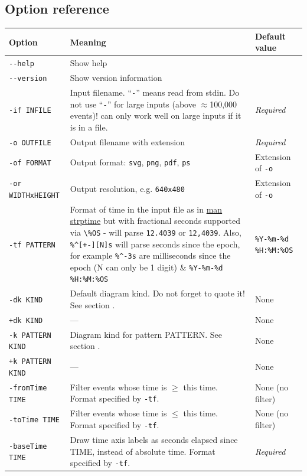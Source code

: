 \documentclass{article}
\begin{document}
\subsection{Option reference}
\begin{longtable}{|l|p{160px}|l|}
\hline
\textbf{Option} & \textbf{Meaning} & \textbf{Default value} \\
\hline
\endhead
\verb|--help| & Show help & \\
\hline
\verb|--version| & Show version information & \\
\hline
\verb|-if INFILE| & Input filename. ``\texttt{-}'' means read from stdin. Do not use ``\texttt{-}'' for large inputs (above $\approx$100,000 events)! \timeplot{} can only work well on large inputs if it is in a file. & \emph{Required} \\
\hline
\verb|-o OUTFILE| & Output filename with extension & \emph{Required} \\
\hline
\verb|-of FORMAT| & Output format: \texttt{svg}, \texttt{png}, \texttt{pdf}, \texttt{ps} & Extension of \texttt{-o} \\
\hline
\verb|-or WIDTHxHEIGHT| & Output resolution, e.g. \texttt{640x480} & Extension of \texttt{-o} \\
\hline
\verb|-tf PATTERN| & Format of time in the input file as in \href{http://linux.die.net/man/3/strptime}{man strptime} but with fractional seconds supported via \verb|\%OS| - will parse \verb|12.4039| or \verb|12,4039|.  Also, \verb|%^[+-][N]s| will parse seconds since the epoch, for example \verb|%^-3s| are milliseconds since the epoch (N can only be 1 digit) & \verb|%Y-%m-%d %H:%M:%OS| \\
\hline
\verb|-dk KIND| & Default diagram kind. Do not forget to quote it! See section \nameref{sec:tplot-track-mapping}. & None \\
\hline
\verb|+dk KIND| & --- & None \\
\hline
\verb|-k PATTERN KIND| & Diagram kind for pattern PATTERN. See section \nameref{sec:tplot-track-mapping}. & None \\
\hline
\verb|+k PATTERN KIND| & --- & None \\
\hline
\verb|-fromTime TIME| & Filter events whose time is $\ge$ this time. Format specified by \texttt{-tf}. & None (no filter) \\
\hline
\verb|-toTime TIME| & Filter events whose time is $\le$ this time. Format specified by \texttt{-tf}. & None (no filter) \\
\hline
\verb|-baseTime TIME| & Draw time axis labels as seconds elapsed since TIME, instead of absolute time. Format specified by \texttt{-tf}. & \emph{Required} \\
\hline
\end{longtable}
\end{document}
